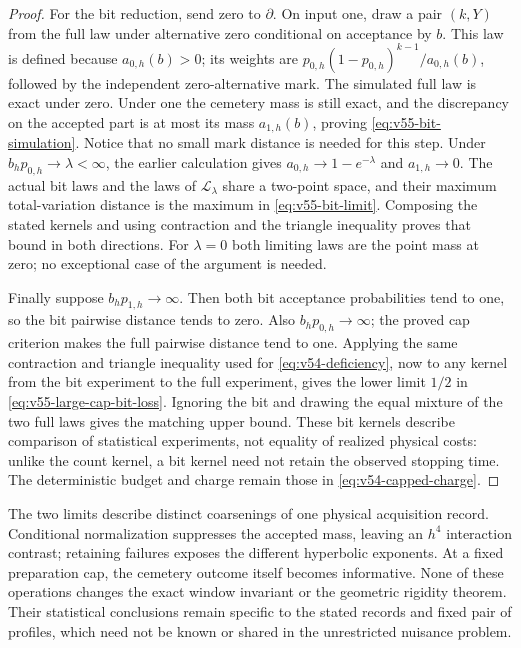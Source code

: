 \begin{proof}
For the bit reduction, send zero to $\partial$.  On input one, draw a
pair $(k,Y)$ from the full law under alternative zero conditional on
acceptance by $b$.  This law is defined because $a_{0,h}(b)>0$;
its weights are
$p_{0,h}(1-p_{0,h})^{k-1}/a_{0,h}(b)$, followed by the independent
zero-alternative mark.  The simulated full law is exact under zero.
Under one the cemetery mass is still exact, and the discrepancy on
the accepted part is at most its mass $a_{1,h}(b)$, proving
\eqref{eq:v55-bit-simulation}.  Notice that no small mark distance
is needed for this step.  Under $b_hp_{0,h}\to\lambda<\infty$,
the earlier calculation gives $a_{0,h}\to1-e^{-\lambda}$ and
$a_{1,h}\to0$.  The actual bit laws and the laws of
$\mathcal L_\lambda$ share a two-point space, and their maximum
total-variation distance is the maximum in
\eqref{eq:v55-bit-limit}.  Composing the stated kernels and using
contraction and the triangle inequality proves that bound in both
directions.  For $\lambda=0$ both limiting laws are the point mass
at zero; no exceptional case of the argument is needed.

Finally suppose $b_hp_{1,h}\to\infty$.  Then both bit acceptance
probabilities tend to one, so the bit pairwise distance tends to zero.
Also $b_hp_{0,h}\to\infty$; the proved cap criterion makes the full
pairwise distance tend to one.  Applying the same contraction and
triangle inequality used for \eqref{eq:v54-deficiency}, now to any
kernel from the bit experiment to the full experiment, gives the
lower limit $1/2$ in \eqref{eq:v55-large-cap-bit-loss}.  Ignoring the
bit and drawing the equal mixture of the two full laws gives the
matching upper bound.  These bit kernels describe comparison of
statistical experiments, not equality of realized physical costs:
unlike the count kernel, a bit kernel need not retain the observed
stopping time.  The deterministic budget and charge remain those in
\eqref{eq:v54-capped-charge}.

\end{proof}

The two limits describe distinct coarsenings of one physical acquisition
record.  Conditional normalization suppresses the accepted mass, leaving
an $h^4$ interaction contrast; retaining failures exposes the different
hyperbolic exponents.  At a fixed preparation cap, the cemetery outcome
itself becomes informative.  None of these operations changes the exact
window invariant or the geometric rigidity theorem.  Their statistical
conclusions remain specific to the stated records and fixed pair of
profiles, which need not be known or shared in the unrestricted nuisance
problem.
